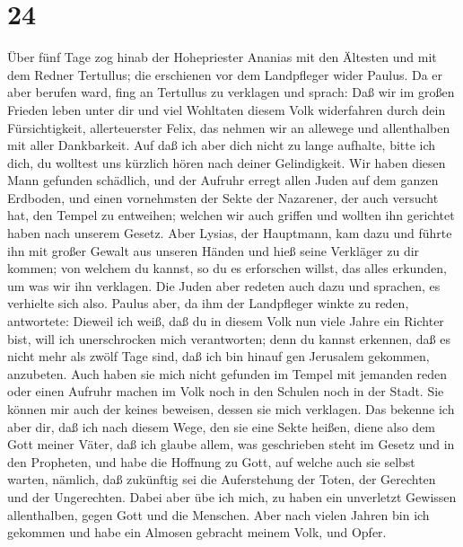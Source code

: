 \hypertarget{section-23}{%
\section{24}\label{section-23}}

 Über fünf Tage zog hinab der Hohepriester Ananias mit den
Ältesten und mit dem Redner Tertullus; die erschienen vor dem
Landpfleger wider Paulus.  Da er aber berufen ward, fing an
Tertullus zu verklagen und sprach:  Daß wir im großen
Frieden leben unter dir und viel Wohltaten diesem Volk widerfahren durch
dein Fürsichtigkeit, allerteuerster Felix, das nehmen wir an allewege
und allenthalben mit aller Dankbarkeit.  Auf daß ich aber
dich nicht zu lange aufhalte, bitte ich dich, du wolltest uns kürzlich
hören nach deiner Gelindigkeit.  Wir haben diesen Mann
gefunden schädlich, und der Aufruhr erregt allen Juden auf dem ganzen
Erdboden, und einen vornehmsten der Sekte der Nazarener, 
der auch versucht hat, den Tempel zu entweihen; welchen wir auch griffen
und wollten ihn gerichtet haben nach unserem Gesetz.  Aber
Lysias, der Hauptmann, kam dazu und führte ihn mit großer Gewalt aus
unseren Händen  und hieß seine Verkläger zu dir kommen; von
welchem du kannst, so du es erforschen willst, das alles erkunden, um
was wir ihn verklagen.  Die Juden aber redeten auch dazu und
sprachen, es verhielte sich also.  Paulus aber, da ihm der
Landpfleger winkte zu reden, antwortete: Dieweil ich weiß, daß du in
diesem Volk nun viele Jahre ein Richter bist, will ich unerschrocken
mich verantworten;  denn du kannst erkennen, daß es nicht
mehr als zwölf Tage sind, daß ich bin hinauf gen Jerusalem gekommen,
anzubeten.  Auch haben sie mich nicht gefunden im Tempel
mit jemanden reden oder einen Aufruhr machen im Volk noch in den Schulen
noch in der Stadt.  Sie können mir auch der keines
beweisen, dessen sie mich verklagen.  Das bekenne ich aber
dir, daß ich nach diesem Wege, den sie eine Sekte heißen, diene also dem
Gott meiner Väter, daß ich glaube allem, was geschrieben steht im Gesetz
und in den Propheten,  und habe die Hoffnung zu Gott, auf
welche auch sie selbst warten, nämlich, daß zukünftig sei die
Auferstehung der Toten, der Gerechten und der Ungerechten. 
Dabei aber übe ich mich, zu haben ein unverletzt Gewissen allenthalben,
gegen Gott und die Menschen.  Aber nach vielen Jahren bin
ich gekommen und habe ein Almosen gebracht meinem Volk, und Opfer.

